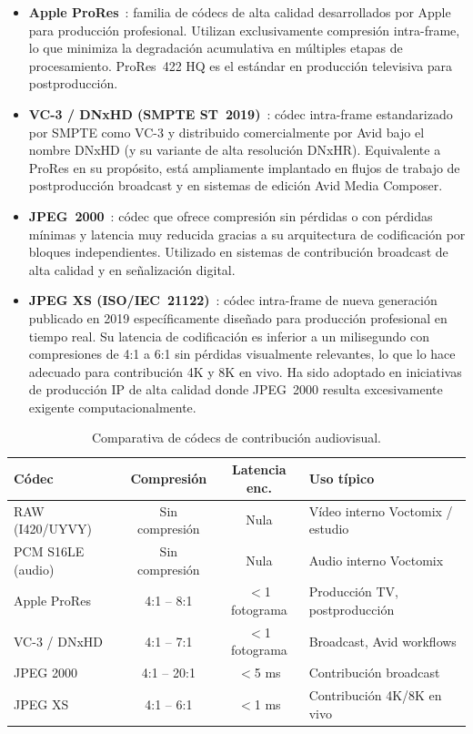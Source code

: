 \begin{itemize}
  \item \textbf{Apple ProRes}~\cite{apple_prores}: familia de códecs de alta calidad
  desarrollados por Apple para producción profesional. Utilizan exclusivamente compresión
  intra-frame, lo que minimiza la degradación acumulativa en múltiples etapas de
  procesamiento. ProRes~422 HQ es el estándar en producción televisiva para
  postproducción.

  \item \textbf{VC-3 / DNxHD (SMPTE ST~2019)}~\cite{smpte_vc3,avid_dnxhd}: códec
  intra-frame estandarizado por SMPTE como VC-3 y distribuido comercialmente por Avid
  bajo el nombre DNxHD (y su variante de alta resolución DNxHR). Equivalente a ProRes
  en su propósito, está ampliamente implantado en flujos de trabajo de postproducción
  broadcast y en sistemas de edición Avid Media Composer.

  \item \textbf{JPEG~2000}~\cite{jpeg2000_iso}: códec que ofrece compresión sin
  pérdidas o con pérdidas mínimas y latencia muy reducida gracias a su arquitectura de
  codificación por bloques independientes. Utilizado en sistemas de contribución
  broadcast de alta calidad y en señalización digital.

  \item \textbf{JPEG XS (ISO/IEC~21122)}~\cite{jpeg_xs_iso}: códec intra-frame de
  nueva generación publicado en 2019 específicamente diseñado para producción
  profesional en tiempo real. Su latencia de codificación es inferior a un milisegundo
  con compresiones de 4:1 a 6:1 sin pérdidas visualmente relevantes, lo que lo hace
  adecuado para contribución 4K y 8K en vivo. Ha sido adoptado en iniciativas de
  producción IP de alta calidad donde JPEG~2000 resulta excesivamente exigente
  computacionalmente.
\end{itemize}

\begin{table}[H]
  \centering
  \caption{Comparativa de códecs de contribución audiovisual.}
  \label{tab:codecs_contribucion}
  \small
  \begin{tabular}{|l|c|c|l|}
    \hline
    \textbf{Códec} & \textbf{Compresión} & \textbf{Latencia enc.} & \textbf{Uso típico} \\
    \hline
    RAW (I420/UYVY) & Sin compresión & Nula        & Vídeo interno Voctomix / estudio \\
    PCM S16LE (audio) & Sin compresión & Nula      & Audio interno Voctomix \\
    Apple ProRes    & 4:1 -- 8:1     & $<$1 fotograma & Producción TV, postproducción \\
    VC-3 / DNxHD    & 4:1 -- 7:1     & $<$1 fotograma & Broadcast, Avid workflows \\
    JPEG 2000       & 4:1 -- 20:1    & $<$5 ms     & Contribución broadcast \\
    JPEG XS         & 4:1 -- 6:1     & $<$1 ms     & Contribución 4K/8K en vivo \\
    \hline
  \end{tabular}
\end{table}
